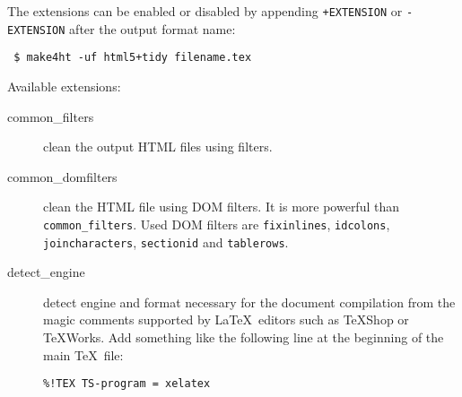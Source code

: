 The extensions can be enabled or disabled by appending
\texttt{+EXTENSION} or \texttt{-EXTENSION} after the output format name:

\begin{verbatim}
 $ make4ht -uf html5+tidy filename.tex
\end{verbatim}

Available extensions:

\begin{description}
\item[common\_filters]
clean the output HTML files using filters.
\item[common\_domfilters]
clean the HTML file using DOM filters. It is more powerful than
\texttt{common\_filters}. Used DOM filters are \texttt{fixinlines},
\texttt{idcolons}, \texttt{joincharacters}, \texttt{sectionid} and
\texttt{tablerows}.
\item[detect\_engine]
detect engine and format necessary for the document compilation from the
magic comments supported by \LaTeX~editors such as TeXShop or TeXWorks.
Add something like the following line at the beginning of the main
\TeX~file:

\texttt{\%!TEX\ TS-program\ =\ xelatex}


\end{description}

